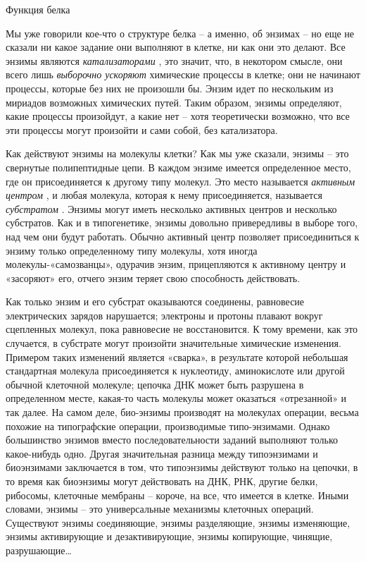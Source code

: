\documentclass[../main.tex]{subfiles}
\begin{document}
Функция белка

Мы уже говорили кое-что о структуре белка \--- а именно, об энзимах \--- но еще не сказали ни какое задание они выполняют в клетке, ни как они это делают. Все энзимы являются \emph{катализаторами} , это значит, что, в некотором смысле, они всего лишь \emph{выборочно ускоряют} химические процессы в клетке; они не начинают процессы, которые без них не произошли бы. Энзим идет по нескольким из мириадов возможных химических путей. Таким образом, энзимы определяют, какие процессы произойдут, а какие нет \--- хотя теоретически возможно, что все эти процессы могут произойти и сами собой, без катализатора.

Как действуют энзимы на молекулы клетки? Как мы уже сказали, энзимы \--- это свернутые полипептидные цепи. В каждом энзиме имеется определенное место, где он присоединяется к другому типу молекул. Это место называется \emph{активным центром} , и любая молекула, которая к нему присоединяется, называется \emph{субстратом} . Энзимы могут иметь несколько активных центров и несколько субстратов. Как и в типогенетике, энзимы довольно привередливы в выборе того, над чем они будут работать. Обычно активный центр позволяет присоединиться к энзиму только определенному типу молекулы, хотя иногда молекулы-«самозванцы», одурачив энзим, прицепляются к активному центру и «засоряют» его, отчего энзим теряет свою способность действовать.

Как только энзим и его субстрат оказываются соединены, равновесие электрических зарядов нарушается; электроны и протоны плавают вокруг сцепленных молекул, пока равновесие не восстановится. К тому времени, как это случается, в субстрате могут произойти значительные химические изменения. Примером таких изменений является «сварка», в результате которой небольшая стандартная молекула присоединяется к нуклеотиду, аминокислоте или другой обычной клеточной молекуле; цепочка ДНК может быть разрушена в определенном месте, какая-то часть молекулы может оказаться «отрезанной» и так далее. На самом деле, био-энзимы производят на молекулах операции, весьма похожие на типографские операции, производимые типо-энзимами. Однако большинство энзимов вместо последовательности заданий выполняют только какое-нибудь одно. Другая значительная разница между типоэнзимами и биоэнзимами заключается в том, что типоэнзимы действуют только на цепочки, в то время как биоэнзимы могут действовать на ДНК, РНК, другие белки, рибосомы, клеточные мембраны \--- короче, на все, что имеется в клетке. Иными словами, энзимы \--- это универсальные механизмы клеточных операций. Существуют энзимы соединяющие, энзимы разделяющие, энзимы изменяющие, энзимы активирующие и дезактивирующие, энзимы копирующие, чинящие, разрушающие\ldots{}
\end{document}
